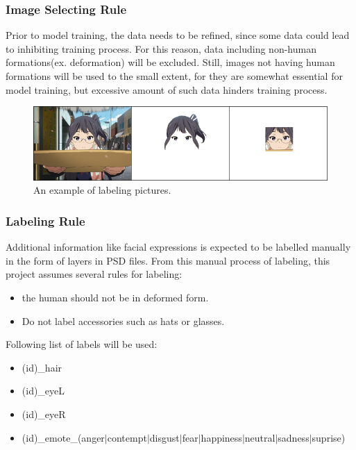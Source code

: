 \documentclass{article}
\begin{document}
\subsubsection{Image Selecting Rule}
Prior to model training, the data needs to be refined, since some data could lead to inhibiting training process. For this reason, data including non-human formations(ex. deformation) will be excluded. Still, images not having human formations will be used to the small extent, for they are somewhat essential for model training, but excessive amount of such data hinders training process.

\begin{figure}[ht]
\vskip 0.2in
\begin{center}
\centerline{\includegraphics[width=\columnwidth]{labeling.png}}
\caption{An example of labeling pictures.}
\label{icml-historical}
\end{center}
\vskip -0.2in
\end{figure}

\subsubsection{Labeling Rule}

Additional information like facial expressions is expected to be labelled manually in the form of layers in PSD files. From this manual process of labeling, this project assumes several rules for labeling:
\begin{itemize}
\item the human should not be in deformed form.
\item Do not label accessories such as hats or glasses. \newline
\end{itemize}

Following list of labels will be used:
\begin{itemize}
\item (id)\_hair
\item (id)\_eyeL
\item (id)\_eyeR
\item (id)\_emote\_(anger$|$contempt$|$disgust$|$fear\newline$|$happiness$|$neutral$|$sadness$|$suprise)
\end{itemize}
\end{document}
